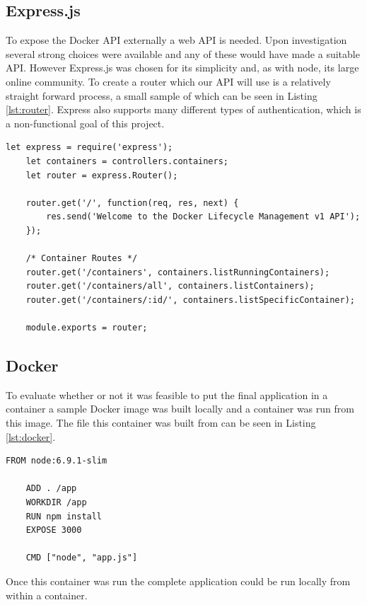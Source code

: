 \subsection{Express.js}
\label{sub:express}

To expose the Docker API externally a web API is needed. Upon investigation several strong choices were available and any of these would have made a suitable API. However Express.js was chosen for its simplicity and, as with node, its large online community. To create a router which our API will use is a relatively straight forward process, a small sample of which can be seen in Listing \ref{lst:router}. Express also supports many different types of authentication, which is a non-functional goal of this project. 

\begin{lstlisting}[caption={Creating an Express.js Router},label={lst:router}]
	let express	= require('express');
	let containers = controllers.containers;
	let router = express.Router();

	router.get('/', function(req, res, next) {
	    res.send('Welcome to the Docker Lifecycle Management v1 API');
	});

	/* Container Routes */
	router.get('/containers', containers.listRunningContainers);
	router.get('/containers/all', containers.listContainers);
	router.get('/containers/:id/', containers.listSpecificContainer);

	module.exports = router;
\end{lstlisting}

\subsection{Docker}
To evaluate whether or not it was feasible to put the final application in a container a sample Docker image was built locally and a container was run from this image. The file this container was built from can be seen in Listing \ref{lst:docker}.

\begin{lstlisting}[caption={Creating a Docker Image},label={lst:docker}]
	FROM node:6.9.1-slim

	ADD . /app  
	WORKDIR /app  
	RUN npm install  
	EXPOSE 3000

	CMD ["node", "app.js"]  
\end{lstlisting}

Once this container was run the complete application could be run locally from within a container.
